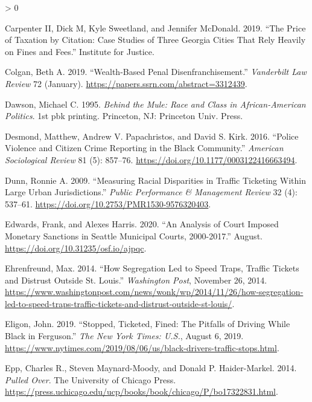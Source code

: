 \documentclass[
  12pt,
]{article}
\newlength{\cslhangindent}
\newenvironment{CSLReferences}[2] %
 {%
  \setlength{\parindent}{0pt}
  \ifodd #1 \everypar{\setlength{\hangindent}{\cslhangindent}}\ignorespaces\fi
  \ifnum #2 > 0
  \setlength{\parskip}{#2\baselineskip}
  \fi
 }%
 {}
\begin{document}
\begin{CSLReferences}{1}{0}
\leavevmode\hypertarget{ref-CarpenterII2019}{}%
Carpenter II, Dick M, Kyle Sweetland, and Jennifer McDonald. 2019. {``The {Price} of {Taxation} by {Citation}: {Case Studies} of {Three Georgia Cities That Rely Heavily} on {Fines} and {Fees}.''} {Institute for Justice}.

\leavevmode\hypertarget{ref-Colgan2019}{}%
Colgan, Beth A. 2019. {``Wealth-{Based Penal Disenfranchisement}.''} \emph{Vanderbilt Law Review} 72 (January). \url{https://papers.ssrn.com/abstract=3312439}.

\leavevmode\hypertarget{ref-Dawson1995}{}%
Dawson, Michael C. 1995. \emph{Behind the Mule: Race and Class in {African}-{American} Politics}. 1st pbk printing. {Princeton, NJ}: {Princeton Univ. Press}.

\leavevmode\hypertarget{ref-Desmond2016}{}%
Desmond, Matthew, Andrew V. Papachristos, and David S. Kirk. 2016. {``Police {Violence} and {Citizen Crime Reporting} in the {Black Community}.''} \emph{American Sociological Review} 81 (5): 857--76. \url{https://doi.org/10.1177/0003122416663494}.

\leavevmode\hypertarget{ref-Dunn2009}{}%
Dunn, Ronnie A. 2009. {``Measuring {Racial Disparities} in {Traffic Ticketing Within Large Urban Jurisdictions}.''} \emph{Public Performance \& Management Review} 32 (4): 537--61. \url{https://doi.org/10.2753/PMR1530-9576320403}.

\leavevmode\hypertarget{ref-Edwards2020}{}%
Edwards, Frank, and Alexes Harris. 2020. {``An {Analysis} of {Court Imposed Monetary Sanctions} in {Seattle Municipal Courts}, 2000-2017.''} August. \url{https://doi.org/10.31235/osf.io/ajpqc}.

\leavevmode\hypertarget{ref-Ehrenfreund2014}{}%
Ehrenfreund, Max. 2014. {``How Segregation Led to Speed Traps, Traffic Tickets and Distrust Outside {St}. {Louis}.''} \emph{Washington Post}, November 26, 2014. \url{https://www.washingtonpost.com/news/wonk/wp/2014/11/26/how-segregation-led-to-speed-traps-traffic-tickets-and-distrust-outside-st-louis/}.

\leavevmode\hypertarget{ref-Eligon2019}{}%
Eligon, John. 2019. {``Stopped, {Ticketed}, {Fined}: {The Pitfalls} of {Driving While Black} in {Ferguson}.''} \emph{The New York Times: U.S.}, August 6, 2019. \url{https://www.nytimes.com/2019/08/06/us/black-drivers-traffic-stops.html}.

\leavevmode\hypertarget{ref-Epp2014}{}%
Epp, Charles R., Steven Maynard-Moody, and Donald P. Haider-Markel. 2014. \emph{Pulled {Over}}. {The University of Chicago Press}. \url{https://press.uchicago.edu/ucp/books/book/chicago/P/bo17322831.html}.


\end{CSLReferences}
\end{document}

